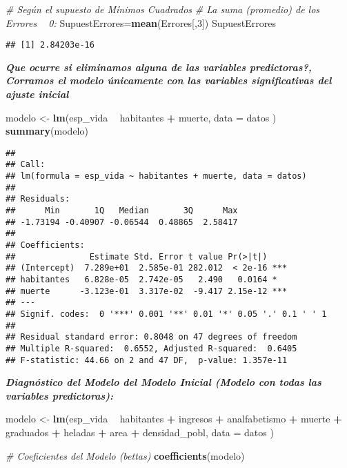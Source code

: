 \documentclass[]{article}
\newenvironment{Shaded}{\begin{snugshade}}{\end{snugshade}}
\newcommand{\KeywordTok}[1]{\textcolor[rgb]{0.13,0.29,0.53}{\textbf{#1}}}
\newcommand{\DataTypeTok}[1]{\textcolor[rgb]{0.13,0.29,0.53}{#1}}
\newcommand{\DecValTok}[1]{\textcolor[rgb]{0.00,0.00,0.81}{#1}}
\newcommand{\StringTok}[1]{\textcolor[rgb]{0.31,0.60,0.02}{#1}}
\newcommand{\CommentTok}[1]{\textcolor[rgb]{0.56,0.35,0.01}{\textit{#1}}}
\newcommand{\OperatorTok}[1]{\textcolor[rgb]{0.81,0.36,0.00}{\textbf{#1}}}
\newcommand{\NormalTok}[1]{#1}
\begin{document}
\begin{Shaded}
\begin{Highlighting}[]
\CommentTok{# Según el supuesto de Mínimos Cuadrados}
\CommentTok{# La suma (promedio) de los Errores ~ 0:}
\NormalTok{SupuestErrores=}\KeywordTok{mean}\NormalTok{(Errores[,}\DecValTok{3}\NormalTok{])}
\NormalTok{SupuestErrores}
\end{Highlighting}
\end{Shaded}

\begin{verbatim}
## [1] 2.84203e-16
\end{verbatim}

\emph{\textbf{Que ocurre si eliminamos alguna de las variables
predictoras?, Corramos el modelo únicamente con las variables
significativas del ajuste inicial}}

\begin{Shaded}
\begin{Highlighting}[]
\NormalTok{modelo <-}\StringTok{ }\KeywordTok{lm}\NormalTok{(esp_vida }\OperatorTok{~}\StringTok{ }\NormalTok{habitantes }\OperatorTok{+}\StringTok{  }\NormalTok{muerte, }\DataTypeTok{data =}\NormalTok{ datos )}
\KeywordTok{summary}\NormalTok{(modelo)}
\end{Highlighting}
\end{Shaded}

\begin{verbatim}
## 
## Call:
## lm(formula = esp_vida ~ habitantes + muerte, data = datos)
## 
## Residuals:
##      Min       1Q   Median       3Q      Max 
## -1.73194 -0.40907 -0.06544  0.48865  2.58417 
## 
## Coefficients:
##               Estimate Std. Error t value Pr(>|t|)    
## (Intercept)  7.289e+01  2.585e-01 282.012  < 2e-16 ***
## habitantes   6.828e-05  2.742e-05   2.490   0.0164 *  
## muerte      -3.123e-01  3.317e-02  -9.417 2.15e-12 ***
## ---
## Signif. codes:  0 '***' 0.001 '**' 0.01 '*' 0.05 '.' 0.1 ' ' 1
## 
## Residual standard error: 0.8048 on 47 degrees of freedom
## Multiple R-squared:  0.6552, Adjusted R-squared:  0.6405 
## F-statistic: 44.66 on 2 and 47 DF,  p-value: 1.357e-11
\end{verbatim}

\emph{\textbf{Diagnóstico del Modelo del Modelo Inicial (Modelo con
todas las variables predictoras):}}

\begin{Shaded}
\begin{Highlighting}[]
\NormalTok{modelo <-}\StringTok{ }\KeywordTok{lm}\NormalTok{(esp_vida }\OperatorTok{~}\StringTok{ }\NormalTok{habitantes }\OperatorTok{+}\StringTok{ }\NormalTok{ingresos }\OperatorTok{+}\StringTok{ }\NormalTok{analfabetismo }\OperatorTok{+}\StringTok{ }\NormalTok{muerte }\OperatorTok{+}\StringTok{ }\NormalTok{graduados }\OperatorTok{+}\StringTok{ }\NormalTok{heladas }\OperatorTok{+}\StringTok{ }\NormalTok{area }\OperatorTok{+}\StringTok{ }\NormalTok{densidad_pobl, }\DataTypeTok{data =}\NormalTok{ datos )}


\CommentTok{# Coeficientes del Modelo (bettas)}
\KeywordTok{coefficients}\NormalTok{(modelo) }
\end{Highlighting}
\end{Shaded}
\end{document}
